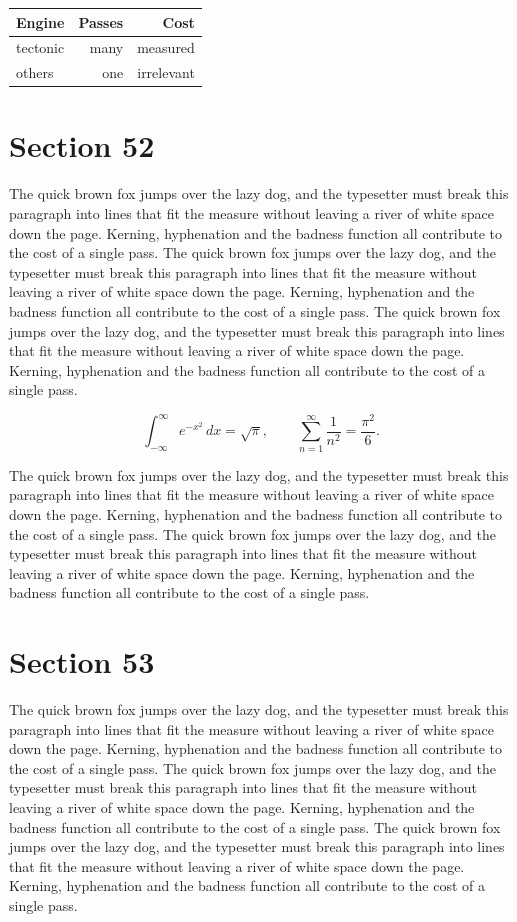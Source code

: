 \documentclass{article}
\begin{document}
\begin{center}
\begin{tabular}{lrr}
\toprule
Engine & Passes & Cost \\
\midrule
tectonic & many & measured \\
others & one & irrelevant \\
\bottomrule
\end{tabular}
\end{center}

\section{Section 52}
The quick brown fox jumps over the lazy dog, and the typesetter must break this paragraph into lines that fit the measure without leaving a river of white space down the page. Kerning, hyphenation and the badness function all contribute to the cost of a single pass. The quick brown fox jumps over the lazy dog, and the typesetter must break this paragraph into lines that fit the measure without leaving a river of white space down the page. Kerning, hyphenation and the badness function all contribute to the cost of a single pass. The quick brown fox jumps over the lazy dog, and the typesetter must break this paragraph into lines that fit the measure without leaving a river of white space down the page. Kerning, hyphenation and the badness function all contribute to the cost of a single pass. 

\begin{equation}
\int_{-\infty}^{\infty} e^{-x^{2}}\,dx = \sqrt{\pi}, \qquad
\sum_{n=1}^{\infty} \frac{1}{n^{2}} = \frac{\pi^{2}}{6}.
\end{equation}

The quick brown fox jumps over the lazy dog, and the typesetter must break this paragraph into lines that fit the measure without leaving a river of white space down the page. Kerning, hyphenation and the badness function all contribute to the cost of a single pass. The quick brown fox jumps over the lazy dog, and the typesetter must break this paragraph into lines that fit the measure without leaving a river of white space down the page. Kerning, hyphenation and the badness function all contribute to the cost of a single pass. 
\section{Section 53}
The quick brown fox jumps over the lazy dog, and the typesetter must break this paragraph into lines that fit the measure without leaving a river of white space down the page. Kerning, hyphenation and the badness function all contribute to the cost of a single pass. The quick brown fox jumps over the lazy dog, and the typesetter must break this paragraph into lines that fit the measure without leaving a river of white space down the page. Kerning, hyphenation and the badness function all contribute to the cost of a single pass. The quick brown fox jumps over the lazy dog, and the typesetter must break this paragraph into lines that fit the measure without leaving a river of white space down the page. Kerning, hyphenation and the badness function all contribute to the cost of a single pass. 
\end{document}
